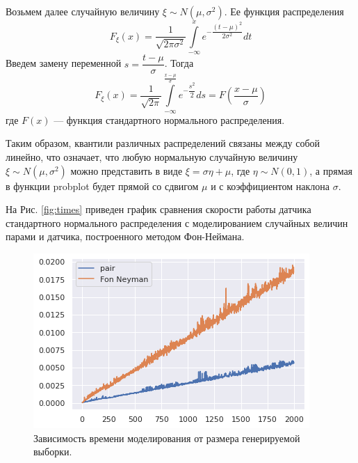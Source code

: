  Возьмем далее случайную величину  \( \xi\sim N(\mu,\sigma^2) \). Ее функция
 распределения
$$
	F_{\xi}(x) = \dfrac{1}{\sqrt{2\pi\sigma^2}} \int\limits_{-\infty}^x
     e^{-\dfrac{(t - \mu)^2}{2 \sigma^2}} dt
$$
Введем замену переменной $ s = \dfrac{t - \mu}{\sigma} $. Тогда
$$
	F_{\xi}(x) = \dfrac{1}{\sqrt{2\pi}} \int\limits_{-\infty}^{\frac{x - \mu}
     {\sigma}} e^{-\dfrac{s^2}{2}} ds = F \left( \dfrac{x - \mu}{\sigma} \right) 
$$
где \( F(x) \) --- функция стандартного нормального распределения.

Таким образом, квантили различных распределений связаны между собой линейно, что
 означает, что любую нормальную случайную величину \( \xi \sim N(\mu, \sigma^2) \)
 можно представить в виде \( \xi = \sigma \eta + \mu \), где \( \eta \sim N(0,1) \),
 а прямая в функции probplot будет прямой со сдвигом \( \mu \) и с коэффициентом
 наклона \( \sigma \).

На Рис. \eqref{fig:times} приведен график сравнения скорости работы датчика
 стандартного нормального распределения с моделированием случайных величин парами
 и датчика, построенного методом Фон-Неймана.

\begin{figure}[ht]
	\centering
	\includegraphics[width = 0.7\linewidth]{"./resources/times.png"}
	\caption{Зависимость времени моделирования от размера генерируемой выборки.}
    \label{fig:times}
\end{figure}
